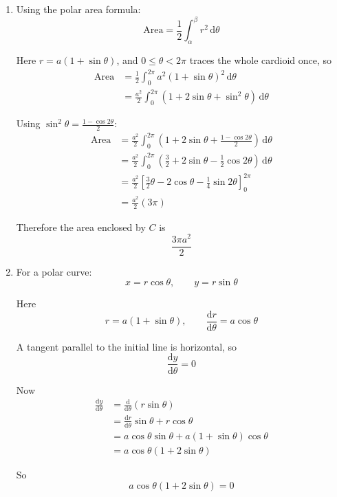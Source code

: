 \documentclass[leqno]{article}
\begin{document}
\begin{enumerate}[
  label=\textbf{\arabic*.},
  leftmargin=*,
  topsep=0pt,
  partopsep=0pt,
  parsep=0pt
]
\begin{djsSolution}
\begin{enumerate}[label=\textbf{(\alph*)}]
  \item Using the polar area formula:
  \[
  \text{Area}=\frac12\int_{\alpha}^{\beta} r^2\,\mathrm{d}\theta
  \]

  Here \(r=a(1+\sin\theta)\), and \(0\le \theta<2\pi\) traces the whole cardioid once, so
  \begin{align*}
  \text{Area}
  &= \frac12\int_0^{2\pi} a^2(1+\sin\theta)^2\,\mathrm{d}\theta \\
  &= \frac{a^2}{2}\int_0^{2\pi}\left(1+2\sin\theta+\sin^2\theta\right)\,\mathrm{d}\theta
  \end{align*}

  Using \(\sin^2\theta=\frac{1-\cos 2\theta}{2}\):
  \begin{align*}
  \text{Area}
  &= \frac{a^2}{2}\int_0^{2\pi}\left(1+2\sin\theta+\frac{1-\cos 2\theta}{2}\right)\,\mathrm{d}\theta \\
  &= \frac{a^2}{2}\int_0^{2\pi}\left(\frac32+2\sin\theta-\frac12\cos 2\theta\right)\,\mathrm{d}\theta \\
  &= \frac{a^2}{2}\left[\frac32\theta-2\cos\theta-\frac14\sin 2\theta\right]_0^{2\pi} \\
  &= \frac{a^2}{2}\left(3\pi\right)
  \end{align*}

  Therefore the area enclosed by \(C\) is
  \[
  \frac{3\pi a^2}{2}
  \]

  \item For a polar curve:
  \[
  x=r\cos\theta,\qquad y=r\sin\theta
  \]

  Here
  \[
  r=a(1+\sin\theta),\qquad \frac{\mathrm{d}r}{\mathrm{d}\theta}=a\cos\theta
  \]

  A tangent parallel to the initial line is horizontal, so
  \[
  \frac{\mathrm{d}y}{\mathrm{d}\theta}=0
  \]

  Now
  \begin{align*}
  \frac{\mathrm{d}y}{\mathrm{d}\theta}
  &= \frac{\mathrm{d}}{\mathrm{d}\theta}(r\sin\theta) \\
  &= \frac{\mathrm{d}r}{\mathrm{d}\theta}\sin\theta+r\cos\theta \\
  &= a\cos\theta\sin\theta+a(1+\sin\theta)\cos\theta \\
  &= a\cos\theta(1+2\sin\theta)
  \end{align*}

  So
  \[
  a\cos\theta(1+2\sin\theta)=0
  \]


\end{enumerate}
\end{djsSolution}
\end{enumerate}
\end{document}
